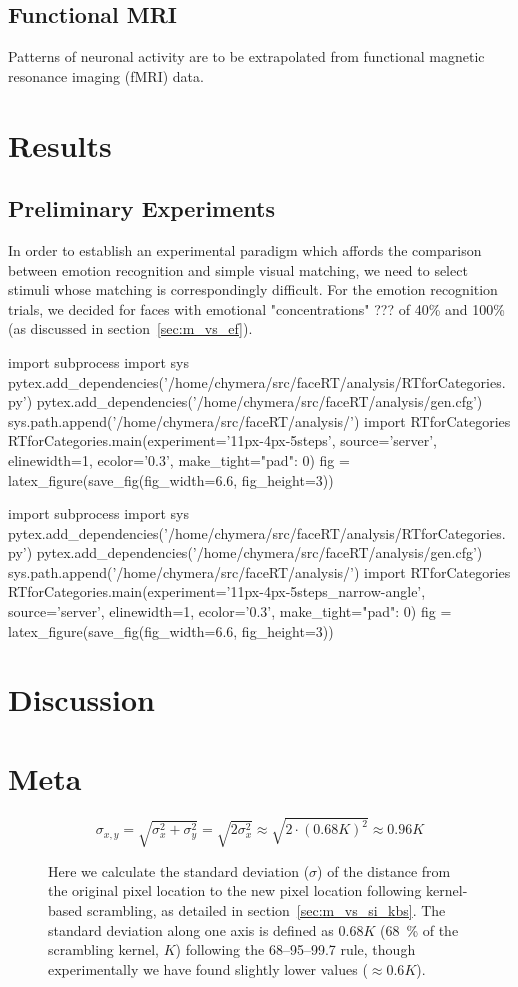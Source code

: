     \section{Functional MRI}
    Patterns of neuronal activity are to be extrapolated from functional magnetic resonance imaging (fMRI) data.
	 
\chapter{Results}
    \section{Preliminary Experiments}\label{sec:r_pe}
    In order to establish an experimental paradigm which affords the comparison between emotion recognition and simple visual matching, we need to select stimuli whose matching is correspondingly difficult.
    For the emotion recognition trials, we decided for faces with emotional "concentrations" ??? of 40\% and 100\% (as discussed in section~\ref{sec:m_vs_ef}).
    \begin{pycode}
import subprocess
import sys
pytex.add_dependencies('/home/chymera/src/faceRT/analysis/RTforCategories.py')
pytex.add_dependencies('/home/chymera/src/faceRT/analysis/gen.cfg')
sys.path.append('/home/chymera/src/faceRT/analysis/')
import RTforCategories
RTforCategories.main(experiment='11px-4px-5steps', source='server', elinewidth=1, ecolor='0.3', make_tight={"pad": 0})
fig = latex_figure(save_fig(fig_width=6.6, fig_height=3))
    \end{pycode}
\begin{pycode}
import subprocess
import sys
pytex.add_dependencies('/home/chymera/src/faceRT/analysis/RTforCategories.py')
pytex.add_dependencies('/home/chymera/src/faceRT/analysis/gen.cfg')
sys.path.append('/home/chymera/src/faceRT/analysis/')
import RTforCategories
RTforCategories.main(experiment='11px-4px-5steps_narrow-angle', source='server', elinewidth=1, ecolor='0.3', make_tight={"pad": 0})
fig = latex_figure(save_fig(fig_width=6.6, fig_height=3))
    \end{pycode}
\chapter{Discussion}
\chapter{Meta}
\begin{figure}
\[ \sigma_{x,y} = \sqrt{\sigma_{x}^{2}+\sigma_{y}^{2}} = \sqrt{2\sigma_{x}^{2}} \approx \sqrt{2 \cdot (0.68 K)^{2}} \approx 0.96K\]
\caption{Here we calculate the standard deviation ($\sigma$) of the distance from the original pixel location to the new pixel location following kernel-based scrambling, as detailed in section~\ref{sec:m_vs_si_kbs}. The standard deviation along one axis is defined as $0.68K$ (\SI{68}{\percent} of the scrambling kernel, $K$) following the 68–95–99.7 rule, though experimentally we have found slightly lower values ($\approx 0.6K$).}\label{eq:lrgn}
\end{figure}

